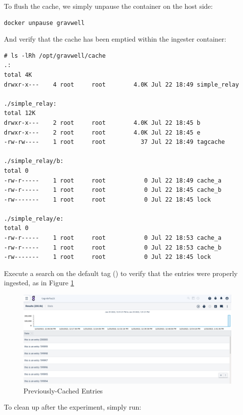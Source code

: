 To flush the cache, we simply unpause the container on the host side:

\begin{Verbatim}[breaklines=true]
docker unpause gravwell
\end{Verbatim}

And verify that the cache has been emptied within the ingester
container:

\begin{Verbatim}[breaklines=true]
# ls -lRh /opt/gravwell/cache
.:
total 4K
drwxr-x---    4 root     root        4.0K Jul 22 18:49 simple_relay

./simple_relay:
total 12K
drwxr-x---    2 root     root        4.0K Jul 22 18:45 b
drwxr-x---    2 root     root        4.0K Jul 22 18:45 e
-rw-rw----    1 root     root          37 Jul 22 18:49 tagcache

./simple_relay/b:
total 0
-rw-r-----    1 root     root           0 Jul 22 18:49 cache_a
-rw-r-----    1 root     root           0 Jul 22 18:45 cache_b
-rw-------    1 root     root           0 Jul 22 18:45 lock

./simple_relay/e:
total 0
-rw-r-----    1 root     root           0 Jul 22 18:53 cache_a
-rw-r-----    1 root     root           0 Jul 22 18:53 cache_b
-rw-------    1 root     root           0 Jul 22 18:45 lock
\end{Verbatim}

Execute a search on the default tag () to verify
that the entries were properly ingested, as in Figure \ref{fig:cache-lab}

\begin{figure}
	\includegraphics{images/igst-cache-lab.png}
	\caption{Previously-Cached Entries}
	\label{fig:cache-lab}
\end{figure}

To clean up after the experiment, simply run:



